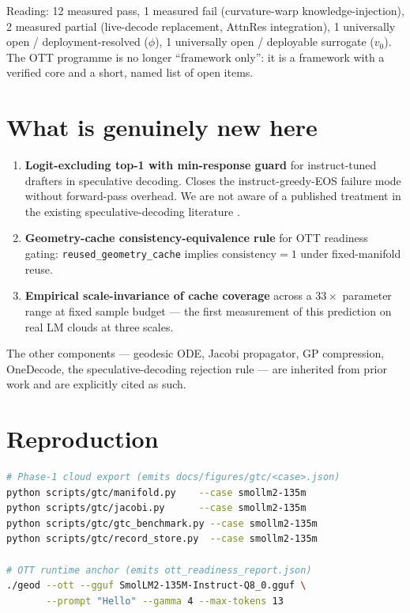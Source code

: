\documentclass[11pt]{article}
\begin{document}
Reading: 12 measured pass, 1 measured fail (curvature-warp
knowledge-injection), 2 measured partial (live-decode replacement, AttnRes
integration), 1 universally open / deployment-resolved ($\phi$), 1
universally open / deployable surrogate ($v_0$). The OTT programme is no
longer ``framework only'': it is a framework with a verified core and a
short, named list of open items.

\section{What is genuinely new here}

\begin{enumerate}
  \item \textbf{Logit-excluding top-1 with min-response guard} for
        instruct-tuned drafters in speculative decoding. Closes the
        instruct-greedy-EOS failure mode without forward-pass overhead. We are
        not aware of a published treatment in the existing speculative-decoding
        literature \cite{leviathan2023fast,chen2023accelerating,cai2024medusa,li2024eagle}.
  \item \textbf{Geometry-cache consistency-equivalence rule} for OTT readiness
        gating: \texttt{reused\_geometry\_cache} implies $\text{consistency}=1$
        under fixed-manifold reuse.
  \item \textbf{Empirical scale-invariance of cache coverage} across a
        $33\times$ parameter range at fixed sample budget --- the first
        measurement of this prediction on real LM clouds at three scales.
\end{enumerate}

The other components --- geodesic ODE, Jacobi propagator, GP compression,
OneDecode, the speculative-decoding rejection rule --- are inherited from
prior work and are explicitly cited as such.

\section{Reproduction}

\begin{lstlisting}[language=bash]
# Phase-1 cloud export (emits docs/figures/gtc/<case>.json)
python scripts/gtc/manifold.py    --case smollm2-135m
python scripts/gtc/jacobi.py      --case smollm2-135m
python scripts/gtc/gtc_benchmark.py --case smollm2-135m
python scripts/gtc/record_store.py  --case smollm2-135m

# OTT runtime anchor (emits ott_readiness_report.json)
./geod --ott --gguf SmolLM2-135M-Instruct-Q8_0.gguf \
       --prompt "Hello" --gamma 4 --max-tokens 13
\end{lstlisting}
\end{document}
